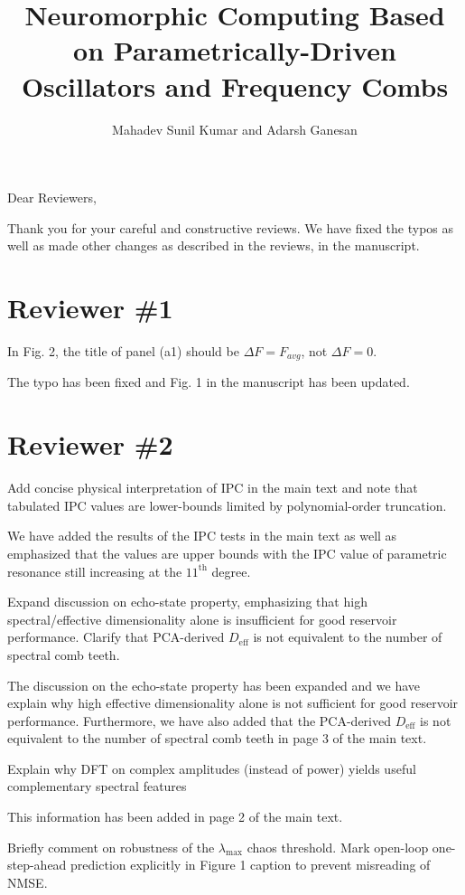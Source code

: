 \documentclass{ar2rc}
\title{Neuromorphic Computing Based on Parametrically-Driven \\Oscillators and Frequency Combs}
\author{Mahadev Sunil Kumar and Adarsh Ganesan}
\begin{document}
	\maketitle

	Dear Reviewers,

	Thank you for your careful and constructive reviews. We have fixed the typos as well as made other changes as described in the reviews, in the manuscript.

	\newpage

	\section{Reviewer \#1}
	\RC In Fig. 2, the title of panel (a1) should be $\Delta F = F_{avg}$, not $\Delta F = 0$.

	\AR The typo has been fixed and Fig. 1 in the manuscript has been updated.

	\section{Reviewer \#2}
	\RC Add concise physical interpretation of IPC in the main text and note that tabulated IPC values are lower-bounds limited by polynomial-order truncation.

	\AR We have added the results of the IPC tests in the main text as well as emphasized that the values are upper bounds with the IPC value of parametric resonance still increasing at the $11^{\text{th}}$ degree.

	\RC Expand discussion on echo-state property, emphasizing that high spectral/effective dimensionality alone is insufficient for good reservoir performance. Clarify that PCA-derived $D_\text{eff}$ is not equivalent to the number of spectral comb teeth.

	\AR The discussion on the echo-state property has been expanded and we have explain why high effective dimensionality alone is not sufficient for good reservoir performance.
	Furthermore, we have also added that the PCA-derived $D_\text{eff}$ is not equivalent to the number of spectral comb teeth in page 3 of the main text.

	\RC Explain why DFT on complex amplitudes (instead of power) yields useful complementary spectral features

	\AR This information has been added in page 2 of the main text.

	\RC Briefly comment on robustness of the $\lambda_{\max}$ chaos threshold. Mark open-loop one-step-ahead prediction explicitly in Figure 1 caption to prevent misreading
	of NMSE.
\end{document}
